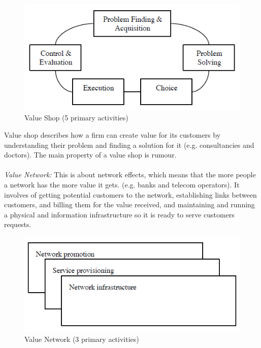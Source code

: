 \begin{figure}
\begin{center}
\includegraphics[scale=0.8]{valueshopnew}
\caption[Value Shop]{Value Shop (5 primary activities) \cite{osterwalderthesis}}
\label{fig:ValueShop}
\end{center}
\end{figure}
Value shop describes how a firm can create value for its customers by understanding their problem and finding a solution for it (e.g. consultancies and doctors). The main property of a value shop is rumour.  \\ \\
\emph{Value Network:}
This is about network effects, which means that the more people a network has the more value it gets. (e.g. banks and telecom operators). It involves of getting potential customers to the network, establishing links between customers, and billing them for the value received, and maintaining and running a physical and information infrastructure so it is ready to serve customers requests. 
\begin{figure}
\begin{center}
\includegraphics[scale=0.7]{valuenetworknew}
\caption[Value Network]{Value Network (3 primary activities) \cite{osterwalderthesis}}
\label{fig:ValueNetwork}
\end{center}
\end{figure}

